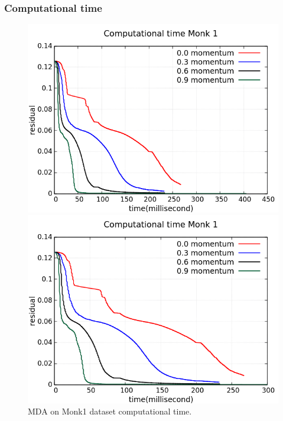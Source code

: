 \subsubsection{Computational time} 
\begin{figure}[H]
	\centering
	\begin{minipage}[t]{0.5\linewidth}
		\includegraphics[width=\linewidth]{data/MGD/Monk1/M/Monk1_MGD_CT_standard.png}
	\end{minipage}%
	\begin{minipage}[t]{0.5\linewidth}
		\includegraphics[width=\linewidth]{data/MGD/Monk1/M/Monk1_MGD_CT_zoom.png}
	\end{minipage}
	\caption{MDA on Monk1 dataset computational time.}
\end{figure}
